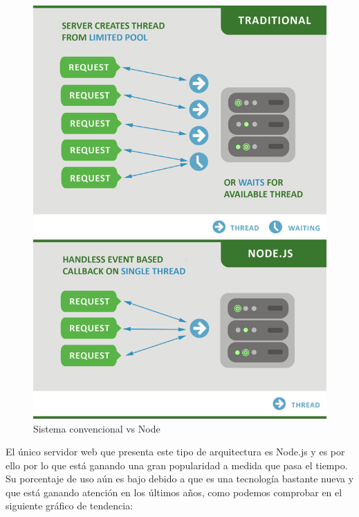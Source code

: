 \begin{figure}[H]
	\centering
	\includegraphics[scale=0.5]{imagenes/traditional-vs-nodejs.jpg}
	\caption{Sistema convencional vs Node\cite{image-node} \label{fig:figura3}}
\end{figure}

El único servidor web que presenta este tipo de arquitectura es Node.js y es por ello por lo que está
ganando una gran popularidad a medida que pasa el tiempo. Su porcentaje de uso aún es bajo debido a que es una tecnología 
bastante nueva y que está ganando atención en los últimos años, como podemos comprobar en el siguiente gráfico
de tendencia:

